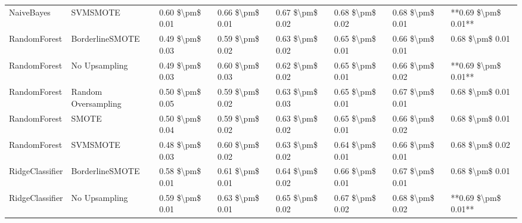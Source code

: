 \begin{tabular}{llllllll}
                     NaiveBayes &                      SVMSMOTE & 0.60 \$\textbackslash pm\$ 0.01 &           0.66 \$\textbackslash pm\$ 0.01 &       0.67 \$\textbackslash pm\$ 0.02 &        0.68 \$\textbackslash pm\$ 0.02 &                         0.68 \$\textbackslash pm\$ 0.01 & **0.69 \$\textbackslash pm\$ 0.01** \\
                   RandomForest &               BorderlineSMOTE & 0.49 \$\textbackslash pm\$ 0.03 &           0.59 \$\textbackslash pm\$ 0.02 &       0.63 \$\textbackslash pm\$ 0.02 &        0.65 \$\textbackslash pm\$ 0.01 &                         0.66 \$\textbackslash pm\$ 0.01 &     0.68 \$\textbackslash pm\$ 0.01 \\
                   RandomForest &                 No Upsampling & 0.49 \$\textbackslash pm\$ 0.03 &           0.60 \$\textbackslash pm\$ 0.03 &       0.62 \$\textbackslash pm\$ 0.02 &        0.65 \$\textbackslash pm\$ 0.01 &                         0.66 \$\textbackslash pm\$ 0.02 & **0.69 \$\textbackslash pm\$ 0.01** \\
                   RandomForest &           Random Oversampling & 0.50 \$\textbackslash pm\$ 0.05 &           0.59 \$\textbackslash pm\$ 0.02 &       0.63 \$\textbackslash pm\$ 0.03 &        0.65 \$\textbackslash pm\$ 0.01 &                         0.67 \$\textbackslash pm\$ 0.01 &     0.68 \$\textbackslash pm\$ 0.01 \\
                   RandomForest &                         SMOTE & 0.50 \$\textbackslash pm\$ 0.04 &           0.59 \$\textbackslash pm\$ 0.02 &       0.63 \$\textbackslash pm\$ 0.02 &        0.65 \$\textbackslash pm\$ 0.01 &                         0.66 \$\textbackslash pm\$ 0.02 &     0.68 \$\textbackslash pm\$ 0.01 \\
                   RandomForest &                      SVMSMOTE & 0.48 \$\textbackslash pm\$ 0.03 &           0.60 \$\textbackslash pm\$ 0.02 &       0.63 \$\textbackslash pm\$ 0.02 &        0.64 \$\textbackslash pm\$ 0.01 &                         0.66 \$\textbackslash pm\$ 0.01 &     0.68 \$\textbackslash pm\$ 0.02 \\
                RidgeClassifier &               BorderlineSMOTE & 0.58 \$\textbackslash pm\$ 0.01 &           0.61 \$\textbackslash pm\$ 0.01 &       0.64 \$\textbackslash pm\$ 0.02 &        0.66 \$\textbackslash pm\$ 0.01 &                         0.67 \$\textbackslash pm\$ 0.01 &     0.68 \$\textbackslash pm\$ 0.01 \\
                RidgeClassifier &                 No Upsampling & 0.59 \$\textbackslash pm\$ 0.01 &           0.63 \$\textbackslash pm\$ 0.01 &       0.65 \$\textbackslash pm\$ 0.02 &        0.67 \$\textbackslash pm\$ 0.02 &                         0.68 \$\textbackslash pm\$ 0.02 & **0.69 \$\textbackslash pm\$ 0.01** \\

\end{tabular}
